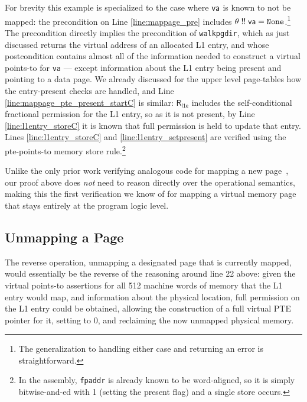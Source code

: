 For brevity this example is specialized to the case where $\mathsf{va}$ is known to not be mapped:
the precondition on Line \ref{line:mappage_pre} includes $\theta \; !!\; \mathsf{va} = \texttt{None}$.\footnote{
  The generalization to handling either case and returning an error is straightforward.
}
The precondition directly implies the precondition of \lstinline|walkpgdir|, which as just discussed
returns the virtual address of an allocated L1 entry, and whose postcondition contains almost all of the information
needed to construct a virtual points-to for \lstinline|va| --- except information about the L1 entry
being present and pointing to a data page.
We already discussed for the upper level page-tables how the entry-present checks are handled, and
Line \ref{line:mappage_pte_present_startC} is similar: $\mathsf{R}_{\textsf{l1e}}$ includes the self-conditional
fractional permission for the L1 entry, so as it is not present, by Line \ref{line:l1entry_storeC}
it is known that full permission is held to update that entry.
Lines \ref{line:l1entry_storeC} and \ref{line:l1entry_setpresent} are verified using the pte-points-to
memory store rule.\footnote{In the assembly, \lstinline|fpaddr| is already known to be word-aligned, so it is simply bitwise-and-ed with 1
(setting the present flag) and a single store occurs.}

Unlike the only prior work verifying analogous code for mapping a new page~\cite{kolanski08vstte,kolanski09tphols}, our proof above
does \emph{not} need to reason directly over the operational semantics,
making this the first verification we know of for mapping a virtual memory page that
stays entirely at the program logic level.
\ifPLDI
\else
\subsection{Unmapping a Page}
The reverse operation, unmapping a designated page that is currently mapped,
would essentially be the reverse of
the reasoning around line 22 above: given the virtual points-to assertions for all 512
machine words of memory that the L1 entry would map,
and information about the physical location, 
full permission on the L1 entry could be obtained, allowing the construction of a
full virtual PTE pointer for it, setting to 0, and reclaiming the now unmapped physical memory.
\fi

